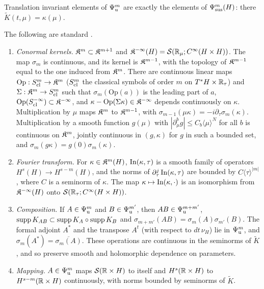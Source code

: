 Translation invariant elements of \(\Psi_{\mathrm u}^m\) are exactly the elements of
\(\Psi_{\mathrm{sus}}^m(H)\): there \(\widetilde K(t,\mu)=\kappa(\mu)\).

\begin{background}
\label{cc:bg:uniform}
The following are standard \cite[Ch.~2, Ch.~4]{MelroseMicro}.
\begin{enumerate}
\item[(K1)] \emph{Conormal kernels.} \(\mathfrak K^m\subset\mathfrak K^{m+1}\) and
\(\mathfrak K^{-\infty}(H)=\mathcal S(\mathbb R_\mu;C^\infty(H\times H))\). The map
\(\sigma_m\) is continuous, and its kernel is \(\mathfrak K^{m-1}\), with the
topology of \(\mathfrak K^{m-1}\) equal to the one induced from \(\mathfrak K^m\). There are
continuous linear maps \(\mathrm{Op}:S_{\mathrm{cl}}^m\to\mathfrak K^m\) (\(S_{\mathrm{cl}}^m\) the
classical symbols of order \(m\) on \(T^*H\times\mathbb R_\tau\)) and
\(\Sigma:\mathfrak K^m\to S_{\mathrm{cl}}^m\) such that \(\sigma_m(\mathrm{Op}(a))\) is the
leading part of \(a\), \(\mathrm{Op}(S_{\mathrm{cl}}^{-\infty})\subset
\mathfrak K^{-\infty}\), and \(\kappa-\mathrm{Op}(\Sigma\kappa)\in
\mathfrak K^{-\infty}\) depends continuously on \(\kappa\). Multiplication by
\(\mu\) maps \(\mathfrak K^m\) to \(\mathfrak K^{m-1}\), with
\(\sigma_{m-1}(\mu\kappa)=-i\partial_\tau\sigma_m(\kappa)\).
Multiplication by a smooth function \(g(\mu)\) with
\(|\partial_\mu^bg|\le C_b\langle\mu\rangle^{N}\) for all \(b\) is
continuous on \(\mathfrak K^m\), jointly continuous in \((g,\kappa)\) for \(g\) in
such a bounded set, and \(\sigma_m(g\kappa)=g(0)\sigma_m(\kappa)\).
\item[(K2)] \emph{Fourier transform.} For \(\kappa\in\mathfrak K^m(H)\),
\(\operatorname{In}(\kappa,\tau)\) is a smooth family of operators
\(H^s(H)\to H^{s-m}(H)\), and the norms of \(\partial_\tau^j\operatorname{In}(\kappa,
\tau)\) are bounded by \(C\langle\tau\rangle^{|m|}\), where \(C\) is a
seminorm of \(\kappa\). The map \(\kappa\mapsto\operatorname{In}(\kappa,\cdot)\) is an
isomorphism from \(\mathfrak K^{-\infty}(H)\) onto
\(\mathcal S(\mathbb R_\tau;C^\infty(H\times H))\).
\item[(K3)] \emph{Composition.} If \(A\in\Psi_{\mathrm u}^m\) and \(B\in\Psi_{\mathrm u}^{m'}\),
then \(AB\in\Psi_{\mathrm u}^{m+m'}\), \(\operatorname{supp} K_{AB}\subset\operatorname{supp} K_A\circ\operatorname{supp}
K_B\) and \(\sigma_{m+m'}(AB)=\sigma_m(A)\sigma_{m'}(B)\). The formal
adjoint \(A^*\) and the transpose \(A^t\) (with respect to
\(dt\,\nu_H\)) lie in \(\Psi_{\mathrm u}^m\), and \(\sigma_m(A^*)=
\overline{\sigma_m(A)}\). These operations are continuous in the
seminorms of \(\widetilde K\), and so preserve smooth and holomorphic
dependence on parameters.
\item[(K4)] \emph{Mapping.} \(A\in\Psi_{\mathrm u}^m\) maps \(\mathcal S(\mathbb R\times H)\) to
itself and \(H^s(\mathbb R\times H)\) to \(H^{s-m}(\mathbb R\times H)\) continuously,
with norms bounded by seminorms of \(\widetilde K\).
\end{enumerate}
\end{background}


